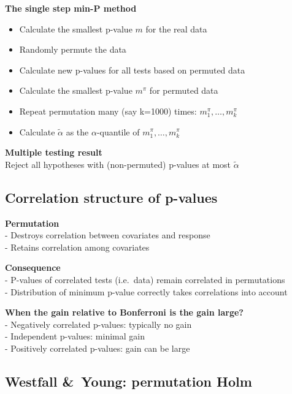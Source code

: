 \documentclass[
]{article}
\providecommand{\tightlist}{%
  \setlength{\itemsep}{0pt}\setlength{\parskip}{0pt}}
\begin{document}
\textbf{The single step min-P method}

\begin{itemize}
\tightlist
\item
  Calculate the smallest p-value \(m\) for the real data\\
\item
  Randomly permute the data\\
\item
  Calculate new p-values for all tests based on permuted data\\
\item
  Calculate the smallest p-value \(m^\pi\) for permuted data\\
\item
  Repeat permutation many (say k=1000) times:
  \(m^\pi_1, \ldots, m^\pi_k\)\\
\item
  Calculate \(\tilde\alpha\) as the \(\alpha\)-quantile of
  \(m^\pi_1, \ldots, m^\pi_k\)
\end{itemize}

\textbf{Multiple testing result}\\
Reject all hypotheses with (non-permuted) p-values at most
\(\tilde\alpha\)

\hypertarget{correlation-structure-of-p-values}{%
\subsection{Correlation structure of
p-values}\label{correlation-structure-of-p-values}}

\textbf{Permutation}\\
- Destroys correlation between covariates and response\\
- Retains correlation among covariates

\textbf{Consequence}\\
- P-values of correlated tests (i.e.~data) remain correlated in
permutations\\
- Distribution of minimum p-value correctly takes correlations into
account

\textbf{When the gain relative to Bonferroni is the gain large?}\\
- Negatively correlated p-values: typically no gain\\
- Independent p-values: minimal gain\\
- Positively correlated p-values: gain can be large

\hypertarget{westfall-young-permutation-holm}{%
\subsection{Westfall \&~Young: permutation
Holm}\label{westfall-young-permutation-holm}}
\end{document}
